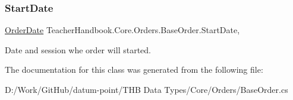 \subsubsection{\texorpdfstring{Start\+Date}{StartDate}}
{\footnotesize\ttfamily \mbox{\hyperlink{struct_teacher_handbook_1_1_core_1_1_orders_1_1_order_date}{Order\+Date}} Teacher\+Handbook.\+Core.\+Orders.\+Base\+Order.\+Start\+Date\hspace{0.3cm}{\ttfamily [get]}, {\ttfamily [set]}}



Date and session whe order will started. 



The documentation for this class was generated from the following file\+:\begin{DoxyCompactItemize}
\item 
D\+:/\+Work/\+Git\+Hub/datum-\/point/\+T\+H\+B Data Types/\+Core/\+Orders/Base\+Order.\+cs\end{DoxyCompactItemize}
